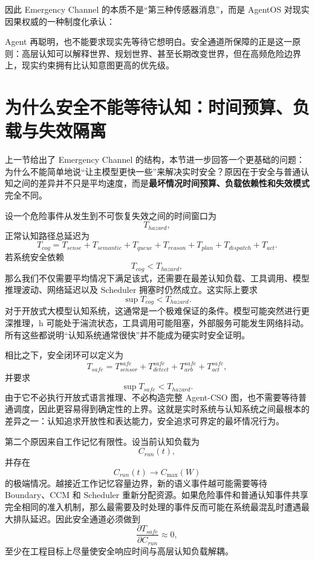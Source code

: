 因此 Emergency Channel 的本质不是“第三种传感器消息”，而是 AgentOS 对现实因果权威的一种制度化承认：
\begin{statementbox}
\centering
{}
\end{statementbox}
Agent 再聪明，也不能要求现实先等待它想明白。安全通道所保障的正是这一原则：高层认知可以解释世界、规划世界、甚至长期改变世界，但在高频危险边界上，现实约束拥有比认知意图更高的优先级。

\section{为什么安全不能等待认知：时间预算、负载与失效隔离}
\label{sec:safety-cannot-wait}

上一节给出了 Emergency Channel 的结构，本节进一步回答一个更基础的问题：为什么不能简单地说“让主模型更快一些”来解决实时安全？原因在于安全与普通认知之间的差异并不只是平均速度，而是\textbf{最坏情况时间预算、负载依赖性和失效模式}完全不同。

设一个危险事件从发生到不可恢复失效之间的时间窗口为
\[
T_{hazard},
\]
正常认知路径总延迟为
\[
T_{cog}
=
T_{sense}
+
T_{semantic}
+
T_{queue}
+
T_{reason}
+
T_{plan}
+
T_{dispatch}
+
T_{act}.
\]
若系统安全依赖
\[
T_{cog}<T_{hazard},
\]
那么我们不仅需要平均情况下满足该式，还需要在最差认知负载、工具调用、模型推理波动、网络延迟以及 Scheduler 拥塞时仍然成立。这实际上要求
\[
\sup T_{cog}
<
T_{hazard}.
\]
对于开放式大模型认知系统，这通常是一个极难保证的条件。模型可能突然进行更深推理，h 可能处于湍流状态，工具调用可能阻塞，外部服务可能发生网络抖动。所有这些都说明“认知系统通常很快”并不能成为硬实时安全证明。

相比之下，安全闭环可以定义为
\[
T_{safe}
=
T_{sensor}^{safe}
+
T_{detect}^{safe}
+
T_{arb}^{safe}
+
T_{act}^{safe},
\]
并要求
\[
\sup T_{safe}
<
T_{hazard}.
\]
由于它不必执行开放式语言推理、不必构造完整 Agent-CSO 图，也不需要等待普通调度，因此更容易得到确定性的上界。这就是实时系统与认知系统之间最根本的差异之一：认知追求开放性和表达能力，安全追求可界定的最坏情况行为。

第二个原因来自工作记忆有限性。设当前认知负载为
\[
C_{run}(t),
\]
并存在
\[
C_{run}(t)\rightarrow C_{\max}(W)
\]
的极端情况。越接近工作记忆容量边界，新的语义事件越可能需要等待 Boundary、CCM 和 Scheduler 重新分配资源。如果危险事件和普通认知事件共享完全相同的准入机制，那么最需要及时处理的事件反而可能在系统最混乱时遭遇最大排队延迟。因此安全通道必须做到
\[
\frac{\partial T_{safe}}{\partial C_{run}}
\approx 0,
\]
至少在工程目标上尽量使安全响应时间与高层认知负载解耦。

